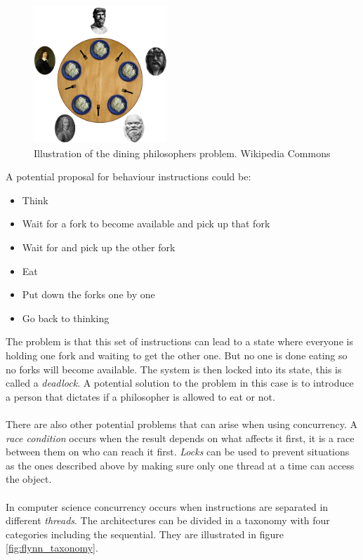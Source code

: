 \documentclass[10pt,a4paper]{report}
\begin{document}
\begin{figure}[h]
    \centering
    \includegraphics[width=5cm]{dining_philosophers.png}
    \caption{Illustration of the dining philosophers problem. Wikipedia Commons}
    \label{fig:dining_philosophers}
\end{figure}

A potential proposal for behaviour instructions could be:
\begin{itemize}
 \item Think
 \item Wait for a fork to become available and pick up that fork
 \item Wait for and pick up the other fork
 \item Eat
 \item Put down the forks one by one
 \item Go back to thinking
\end{itemize}
The problem is that this set of instructions can lead to a state where everyone is holding one fork and waiting to get the other one\cite{hoare1985communicating}. But no one is done eating so no forks will become available. The system is then locked into its state, this is called a \emph{deadlock}\cite{hoare1985communicating, introduction_hpc_hager}. A potential solution to the problem in this case is to introduce a person that dictates if a philosopher is allowed to eat or not\cite{hoare1985communicating}.\\
\\
There are also other potential problems that can arise when using concurrency. A \emph{race condition} occurs when the result depends on what affects it first, it is a race between them on who can reach it first\cite{introduction_hpc_hager}. \emph{Locks} can be used to prevent situations as the ones described above by making sure only one thread at a time can access the object\cite{introduction_hpc_hager}.\\
\\
In computer science concurrency occurs when instructions are separated in different \emph{threads}. The architectures can be divided in a taxonomy with four categories including the sequential. They are illustrated in figure \ref{fig:flynn_taxonomy}.
\end{document}
